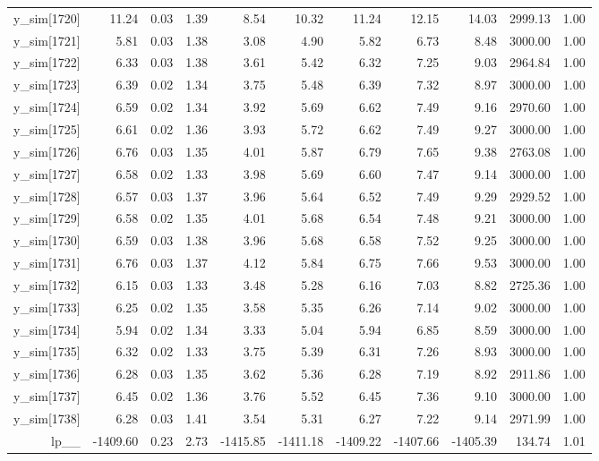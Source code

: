 \begin{table}[ht]
\begin{tabular}{rrrrrrrrrrr}
  y\_sim[1720] & 11.24 & 0.03 & 1.39 & 8.54 & 10.32 & 11.24 & 12.15 & 14.03 & 2999.13 & 1.00 \\ 
  y\_sim[1721] & 5.81 & 0.03 & 1.38 & 3.08 & 4.90 & 5.82 & 6.73 & 8.48 & 3000.00 & 1.00 \\ 
  y\_sim[1722] & 6.33 & 0.03 & 1.38 & 3.61 & 5.42 & 6.32 & 7.25 & 9.03 & 2964.84 & 1.00 \\ 
  y\_sim[1723] & 6.39 & 0.02 & 1.34 & 3.75 & 5.48 & 6.39 & 7.32 & 8.97 & 3000.00 & 1.00 \\ 
  y\_sim[1724] & 6.59 & 0.02 & 1.34 & 3.92 & 5.69 & 6.62 & 7.49 & 9.16 & 2970.60 & 1.00 \\ 
  y\_sim[1725] & 6.61 & 0.02 & 1.36 & 3.93 & 5.72 & 6.62 & 7.49 & 9.27 & 3000.00 & 1.00 \\ 
  y\_sim[1726] & 6.76 & 0.03 & 1.35 & 4.01 & 5.87 & 6.79 & 7.65 & 9.38 & 2763.08 & 1.00 \\ 
  y\_sim[1727] & 6.58 & 0.02 & 1.33 & 3.98 & 5.69 & 6.60 & 7.47 & 9.14 & 3000.00 & 1.00 \\ 
  y\_sim[1728] & 6.57 & 0.03 & 1.37 & 3.96 & 5.64 & 6.52 & 7.49 & 9.29 & 2929.52 & 1.00 \\ 
  y\_sim[1729] & 6.58 & 0.02 & 1.35 & 4.01 & 5.68 & 6.54 & 7.48 & 9.21 & 3000.00 & 1.00 \\ 
  y\_sim[1730] & 6.59 & 0.03 & 1.38 & 3.96 & 5.68 & 6.58 & 7.52 & 9.25 & 3000.00 & 1.00 \\ 
  y\_sim[1731] & 6.76 & 0.03 & 1.37 & 4.12 & 5.84 & 6.75 & 7.66 & 9.53 & 3000.00 & 1.00 \\ 
  y\_sim[1732] & 6.15 & 0.03 & 1.33 & 3.48 & 5.28 & 6.16 & 7.03 & 8.82 & 2725.36 & 1.00 \\ 
  y\_sim[1733] & 6.25 & 0.02 & 1.35 & 3.58 & 5.35 & 6.26 & 7.14 & 9.02 & 3000.00 & 1.00 \\ 
  y\_sim[1734] & 5.94 & 0.02 & 1.34 & 3.33 & 5.04 & 5.94 & 6.85 & 8.59 & 3000.00 & 1.00 \\ 
  y\_sim[1735] & 6.32 & 0.02 & 1.33 & 3.75 & 5.39 & 6.31 & 7.26 & 8.93 & 3000.00 & 1.00 \\ 
  y\_sim[1736] & 6.28 & 0.03 & 1.35 & 3.62 & 5.36 & 6.28 & 7.19 & 8.92 & 2911.86 & 1.00 \\ 
  y\_sim[1737] & 6.45 & 0.02 & 1.36 & 3.76 & 5.52 & 6.45 & 7.36 & 9.10 & 3000.00 & 1.00 \\ 
  y\_sim[1738] & 6.28 & 0.03 & 1.41 & 3.54 & 5.31 & 6.27 & 7.22 & 9.14 & 2971.99 & 1.00 \\ 
  lp\_\_ & -1409.60 & 0.23 & 2.73 & -1415.85 & -1411.18 & -1409.22 & -1407.66 & -1405.39 & 134.74 & 1.01 \\ 
   \hline
\end{tabular}
\end{table}
